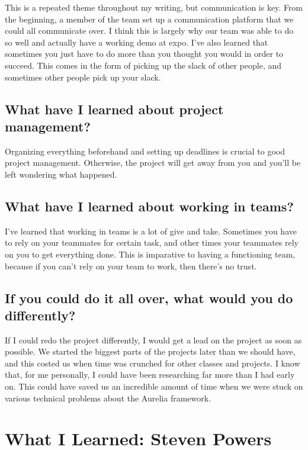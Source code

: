 \documentclass[onecolumn, draftclsnofoot,10pt, compsoc]{IEEEtran}
\begin{document}
This is a repeated theme throughout my writing, but communication is key. From the beginning, a member of the team set up a communication platform that we could all communicate over. I think this is largely why our team was able to do so well and actually have a working demo at expo. I've also learned that sometimes you just have to do more than you thought you would in order to succeed. This comes in the form of picking up the slack of other people, and sometimes other people pick up your slack. 

\subsection{What have I learned about project management?}

Organizing everything beforehand and setting up deadlines is crucial to good project management. Otherwise, the project will get away from you and you'll be left wondering what happened. 

\subsection{What have I learned about working in teams?}

I've learned that working in teams is a lot of give and take. Sometimes you have to rely on your teammates for certain task, and other times your teammates rely on you to get everything done. This is imparative to having a functioning team, because if you can't rely on your team to work, then there's no trust. 

\subsection{If you could do it all over, what would you do differently?}
If I could redo the project differently, I would get a lead on the project as soon as possible. We started the biggest parts of the projects later than we should have, and this costed us when time was crunched for other classes and projects. I know that, for me personally, I could have been researching far more than I had early on. This could have saved us an incredible amount of time when we were stuck on various technical problems about the Aurelia framework.

\newpage
\section{What I Learned: Steven Powers}
\end{document}
